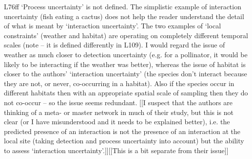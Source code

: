 \documentclass[12pt]{letter}
\newenvironment{refquote}{\bigskip \begin{it}}{\end{it}\smallskip}
\begin{document}
		\begin{refquote}
		L76ff ‘Process uncertainty’ is not defined. The simplistic example of interaction uncertainty (fish eating a cactus) does not help the reader understand the detail of what is meant by ‘interaction uncertainty’. The two examples of ‘local constraints’ (weather and habitat) are operating on completely different temporal scales (note – it is defined differently in L109). I would regard the issue of weather as much closer to detection uncertainty (e.g. for a pollinator, it would be likely to be interacting if the weather was better), whereas the issue of habitat is closer to the authors’ ‘interaction uncertainty’ (the species don’t interact because they are not, or never, co-occurring in a habitat). Also if the species occur in different habitats then with an appropriate spatial scale of sampling then they do not co-occur – so the issue seems redundant. [[I suspect that the authors are thinking of a meta- or master network in much of their study, but this is not clear (or I have misunderstood and it needs to be explained better), i.e. the predicted presence of an interaction is not the presence of an interaction at the local site (taking detection and process uncertainty into account) but the ability to assess ‘interaction uncertainty’.]][[This is a bit separate from their issue]]
		\end{refquote}
\end{document}
